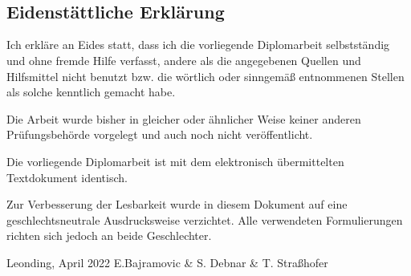 \thispagestyle{empty}
\vspace{3cm}
~ \\ \\
\begin{spacing}{1}
    \chapter*{Eidenstättliche Erklärung}
\end{spacing}
Ich erkläre an Eides statt, dass ich die vorliegende Diplomarbeit selbstständig und ohne fremde Hilfe verfasst, andere als die angegebenen Quellen und Hilfsmittel nicht benutzt bzw. die wörtlich oder sinngemäß entnommenen Stellen als solche kenntlich gemacht habe.

Die Arbeit wurde bisher in gleicher oder ähnlicher Weise keiner anderen Prüfungsbehörde vorgelegt und auch noch nicht veröffentlicht.

Die vorliegende Diplomarbeit ist mit dem elektronisch übermittelten Textdokument identisch.

Zur Verbesserung der Lesbarkeit wurde in diesem Dokument auf eine geschlechtsneutrale Ausdrucksweise verzichtet.
Alle verwendeten Formulierungen richten sich jedoch an beide Geschlechter.


\begin{tabbing}
\doublespacing
Leonding, April 2022 \hspace{3.5cm} E.Bajramovic \& S. Debnar \& T. Straßhofer
\end{tabbing}
\vspace{10cm}

\newpage
\setcounter{page}{1}

